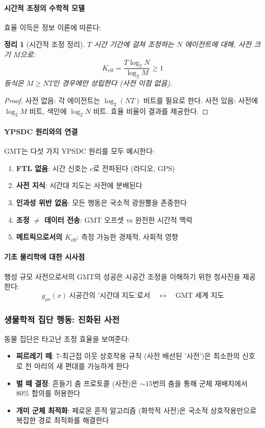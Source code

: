 \documentclass[11pt,a4paper]{article}
\newtheorem{theorem}{정리}
\begin{document}
	\paragraph{시간적 조정의 수학적 모델}
	효율 이득은 정보 이론에 따른다:
	\begin{theorem}[시간적 조정 정리]
		$T$ 시간 기간에 걸쳐 조정하는 $N$ 에이전트에 대해, 사전 크기 $M$으로:
		\begin{equation}
			K_{\mathrm{eff}} = \frac{T \log_2 N}{\log_2 M} \geq 1
		\end{equation}
		등식은 $M \geq NT$인 경우에만 성립한다 (사전 이점 없음).
	\end{theorem}
	
	\begin{proof}
		사전 없음: 각 에이전트는 $\log_2(NT)$ 비트를 필요로 한다. 사전 있음: 사전에 $\log_2 M$ 비트, 색인에 $\log_2 N$ 비트. 효율 비율이 결과를 제공한다.
	\end{proof}
	
	\paragraph{YPSDC 원리와의 연결}
	GMT는 다섯 가지 YPSDC 원리를 모두 예시한다:
	\begin{enumerate}
		\item \textbf{FTL 없음}: 시간 신호는 $c$로 전파된다 (라디오, GPS)
		\item \textbf{사전 지식}: 시간대 지도는 사전에 분배된다
		\item \textbf{인과성 위반 없음}: 모든 행동은 국소적 광원뿔을 존중한다
		\item \textbf{조정 $\neq$ 데이터 전송}: GMT 오프셋 vs 완전한 시간적 맥락
		\item \textbf{메트릭으로서의 $K_{\mathrm{eff}}$}: 측정 가능한 경제적, 사회적 영향
	\end{enumerate}
	
	\paragraph{기초 물리학에 대한 시사점}
	행성 규모 사전으로서의 GMT의 성공은 시공간 조정을 이해하기 위한 청사진을 제공한다:
	\begin{equation}
		g_{\mu\nu}(x) \ \text{시공간의 '시간대 지도'로서} \quad \leftrightarrow \quad \text{GMT 세계 지도}
	\end{equation}
	
	\subsubsection{생물학적 집단 행동: 진화된 사전}
	동물 집단은 타고난 조정 효율을 보여준다:
	\begin{itemize}
		\item \textbf{찌르레기 떼}: 7-최근접 이웃 상호작용 규칙 (사전 배선된 '사전')은 최소한의 신호로 천 마리의 새 편대를 가능하게 한다
		\item \textbf{벌 떼 결정}: 흔들기 춤 프로토콜 (사전)은 $\sim 15$번의 춤을 통해 군체 재배치에서 80\% 합의를 허용한다
		\item \textbf{개미 군체 최적화}: 페로몬 흔적 알고리즘 (화학적 사전)은 국소적 상호작용만으로 복잡한 경로 최적화를 해결한다
	\end{itemize}
	
\end{document}
